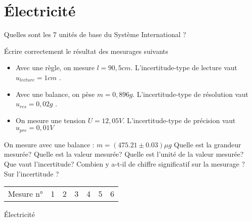 \documentclass[11pt]{exam}		%
\title{\Titre}
\newcommand{\Titre}{Électricité} %
\begin{document}
\thispagestyle{headandfoot}

\section{\Titre} %

\headrule
\footrule
\setlength{\columnsep}{0.25cm}
\setlength{\columnseprule}{1pt}

\consignes



\begin{questions}
	\question[1] Quelles sont les 7 unités de base du Système International ?

	\question[1] Écrire correctement le résultat des mesurages suivants
	\begin{itemize}
		\item 	Avec une règle, on mesure $l = 90,5 cm$. L'incertitude-type de lecture vaut $u_{lecture}= 1 cm$ .
		\item 	Avec une balance, on pèse $m = 0,896 g$. L'incertitude-type de résolution vaut $u_{res}=0,02 g$ .
		\item 	On mesure une tension $U = 12,05 V$. L'incertitude-type de précision vaut $u_{pre} =0,01V$
	\end{itemize}

	\question[1]
	On mesure avec une balance :  $m=(475.21 ± 0.03) μg$
	{Quelle est la grandeur mesurée?}
		{Quelle est la valeur mesurée?}
		{Quelle est l'unité de la valeur mesurée?}
		{Que vaut l'incertitude?}
		{Combien y a-t-il de chiffre significatif sur la mesurage ? Sur l'incertitude ?}

	\question[1] \phantom{}
	\begin{center}
		\begin{tabular}{@{}|l|llllll|@{}} \toprule
			Mesure n° & 1 & 2 & 3 & 4 & 5 & 6 \\
		\end{tabular}
	\end{center}

	\question[1] Électricité

\end{questions}

\countpoint
\end{document}
